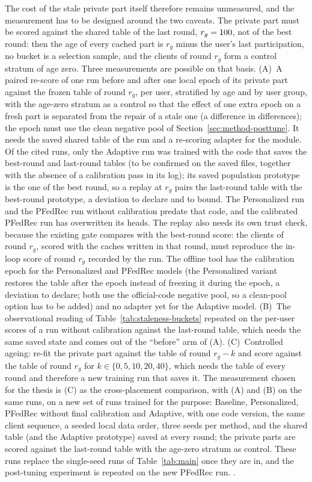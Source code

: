 The cost of the stale private part itself therefore remains unmeasured, and the measurement has
to be designed around the two caveats. The private part must be scored against the shared table
of the last round, $r_g=100$, not of the best round: then the age of every cached part is
$r_g$ minus the user's last participation, no bucket is a selection sample, and the clients of
round $r_g$ form a control stratum of age zero. Three measurements are possible on that basis.
(A)~A paired re-score of one run before and after one local epoch of its private part against
the frozen table of round $r_g$, per user, stratified by age and by user group, with the
age-zero stratum as a control so that the effect of one extra epoch on a fresh part is separated
from the repair of a stale one (a difference in differences); the epoch must use the clean
negative pool of Section~\ref{sec:method-posttune}. It needs the saved shared table of the run
and a re-scoring adapter for the module. Of the cited runs, only the Adaptive run was trained
with the code that saves the best-round and last-round tables (to be confirmed on the saved
files, together with the absence of a calibration pass in its log); its saved population
prototype is the one of the best round, so a replay at $r_g$ pairs the last-round table with
the best-round prototype, a deviation to declare and to bound. The Personalized run and the
PFedRec run without calibration predate that code, and the calibrated PFedRec run has
overwritten its heads. The replay also needs its own trust check, because the existing gate
compares with the best-round score: the clients of round $r_g$, scored with the caches written
in that round, must reproduce the in-loop score of round $r_g$ recorded by the run. The offline tool has the calibration epoch for
the Personalized and PFedRec models (the Personalized variant restores the table after the epoch
instead of freezing it during the epoch, a deviation to declare; both use the official-code
negative pool, so a clean-pool option has to be added) and no adapter yet for the Adaptive
model. (B)~The observational reading of Table~\ref{tab:staleness-buckets} repeated on the
per-user scores of a run without calibration against the last-round table, which needs the
same saved state and comes out of the ``before'' arm of (A). (C)~Controlled ageing: re-fit the
private part against the table of round $r_g-k$ and score against the table of round $r_g$ for
$k\in\{0,5,10,20,40\}$, which needs the table of every round and therefore a new training run
that saves it. The measurement chosen for the thesis is (C) as the cross-placement comparison, with (A) and
(B) on the same runs, on a new set of runs trained for the purpose: Baseline, Personalized,
PFedRec without final calibration and Adaptive, with one code version, the same client sequence,
a seeded local data order, three seeds per method, and the shared table (and the Adaptive
prototype) saved at every round; the private parts are scored against the last-round table with
the age-zero stratum as control. These runs replace the single-seed runs of
Table~\ref{tab:main} once they are in, and the post-tuning experiment is repeated on the new
PFedRec run. .
